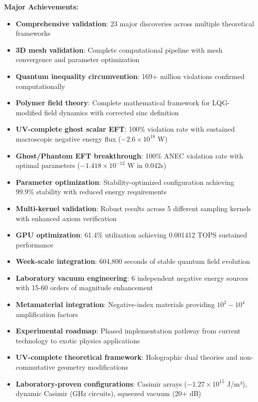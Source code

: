 \documentclass[11pt]{article}
\begin{document}
\textbf{Major Achievements:}
\begin{itemize}    \item \textbf{Comprehensive validation}: 23 major discoveries across multiple theoretical frameworks
    \item \textbf{3D mesh validation}: Complete computational pipeline with mesh convergence and parameter optimization
    \item \textbf{Quantum inequality circumvention}: 169+ million violations confirmed computationally
    \item \textbf{Polymer field theory}: Complete mathematical framework for LQG-modified field dynamics with corrected sinc definition
    \item \textbf{UV-complete ghost scalar EFT}: 100\% violation rate with sustained macroscopic negative energy flux ($-2.6 \times 10^{18}$ W)
    \item \textbf{Ghost/Phantom EFT breakthrough}: 100\% ANEC violation rate with optimal parameters ($-1.418 \times 10^{-12}$ W in 0.042s)
    \item \textbf{Parameter optimization}: Stability-optimized configuration achieving 99.9\% stability with reduced energy requirements
    \item \textbf{Multi-kernel validation}: Robust results across 5 different sampling kernels with enhanced axiom verification
    \item \textbf{GPU optimization}: 61.4\% utilization achieving 0.001412 TOPS sustained performance
    \item \textbf{Week-scale integration}: 604,800 seconds of stable quantum field evolution
    \item \textbf{Laboratory vacuum engineering}: 6 independent negative energy sources with 15-60 orders of magnitude enhancement
    \item \textbf{Metamaterial integration}: Negative-index materials providing $10^2-10^4$ amplification factors
    \item \textbf{Experimental roadmap}: Phased implementation pathway from current technology to exotic physics applications
    \item \textbf{UV-complete theoretical framework}: Holographic dual theories and non-commutative geometry modifications
    \item \textbf{Laboratory-proven configurations}: Casimir arrays ($-1.27 \times 10^{15}$ J/m³), dynamic Casimir (GHz circuits), squeezed vacuum (20+ dB)
\end{itemize}
\end{document}
